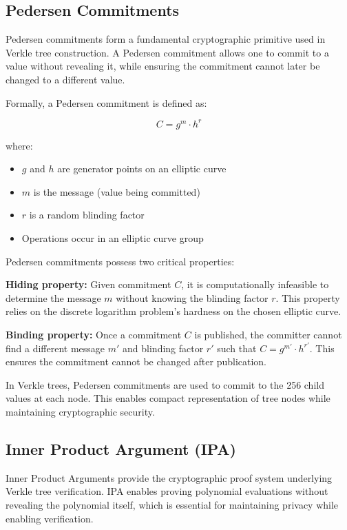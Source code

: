 \subsection{Pedersen Commitments}
\label{subsec:pedersen}

Pedersen commitments form a fundamental cryptographic primitive used in Verkle tree construction. A Pedersen commitment allows one to commit to a value without revealing it, while ensuring the commitment cannot later be changed to a different value.

Formally, a Pedersen commitment is defined as:

\begin{equation}
C = g^m \cdot h^r
\end{equation}

where:
\begin{itemize}
    \item $g$ and $h$ are generator points on an elliptic curve
    \item $m$ is the message (value being committed)
    \item $r$ is a random blinding factor
    \item Operations occur in an elliptic curve group
\end{itemize}

Pedersen commitments possess two critical properties:

\textbf{Hiding property:} Given commitment $C$, it is computationally infeasible to determine the message $m$ without knowing the blinding factor $r$. This property relies on the discrete logarithm problem's hardness on the chosen elliptic curve.

\textbf{Binding property:} Once a commitment $C$ is published, the committer cannot find a different message $m'$ and blinding factor $r'$ such that $C = g^{m'} \cdot h^{r'}$. This ensures the commitment cannot be changed after publication.

In Verkle trees, Pedersen commitments are used to commit to the 256 child values at each node. This enables compact representation of tree nodes while maintaining cryptographic security.

\subsection{Inner Product Argument (IPA)}
\label{subsec:ipa}

Inner Product Arguments provide the cryptographic proof system underlying Verkle tree verification. IPA enables proving polynomial evaluations without revealing the polynomial itself, which is essential for maintaining privacy while enabling verification.

